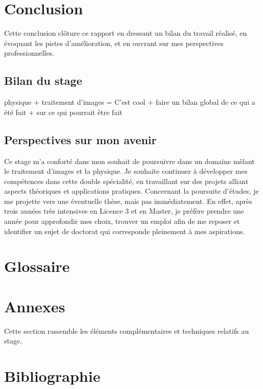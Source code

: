 \documentclass[12pt,a4paper]{report}
\begin{document}
\chapter{Conclusion}

Cette conclusion clôture ce rapport en dressant un bilan du travail réalisé, en évoquant les pistes d'amélioration, et en ouvrant sur mes perspectives professionnelles.

\section{Bilan du stage}
physique + traitement d'images = C'est cool + faire un bilan global de ce qui a été fait + sur ce qui pourrait être fait

\section{Perspectives sur mon avenir}
Ce stage m'a conforté dans mon souhait de poursuivre dans un domaine mêlant le traitement d'images et la physique. Je souhaite continuer à développer mes compétences dans cette double spécialité, en travaillant sur des projets alliant aspects théoriques et applications pratiques.  
Concernant la poursuite d'études, je me projette vers une éventuelle thèse, mais pas immédiatement. En effet, après trois années très intensives en Licence 3 et en Master, je préfère prendre une année pour approfondir mes choix, trouver un emploi afin de me reposer et identifier un sujet de doctorat qui corresponde pleinement à mes aspirations.

\chapter{Glossaire}



\appendix
\chapter{Annexes}

Cette section rassemble les éléments complémentaires et techniques relatifs au stage.

\chapter{Bibliographie}
\end{document}
